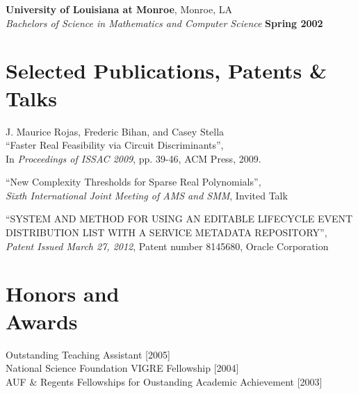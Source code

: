 \documentclass[margin,line,12pt]{resume}
\begin{document}
\begin{resume}
    \textbf{University of Louisiana at Monroe}, Monroe, LA \vspace{2mm}\\\vspace{1mm}%
    \textsl{Bachelors of Science in Mathematics and Computer Science} \hfill \textbf{ Spring 2002}\vspace{-3mm}\\\vspace{-1mm}%

    \section{\mysidestyle Selected Publications, Patents \& Talks}

    J. Maurice Rojas, Frederic Bihan, and Casey Stella\\
    ``Faster Real Feasibility via Circuit Discriminants'',\\
    In \textsl{Proceedings of ISSAC 2009}, pp. 39-46, ACM Press, 2009.

\vspace{-2mm}
    ``New Complexity Thresholds for Sparse Real Polynomials'',\\
    \textsl{Sixth International Joint Meeting of AMS and SMM}, Invited Talk

    ``SYSTEM AND METHOD FOR USING AN EDITABLE LIFECYCLE EVENT DISTRIBUTION LIST WITH A SERVICE METADATA REPOSITORY'',\\
    \textsl{Patent Issued March 27, 2012}, Patent number 8145680, Oracle Corporation
    
    \section{\mysidestyle Honors and\\Awards} 

    Outstanding Teaching Assistant [2005]                                                           \vspace{1mm}\\
    National Science Foundation VIGRE Fellowship [2004]                                             \vspace{1mm}\\
    AUF \& Regents Fellowships for Oustanding Academic Achievement [2003]                           


\end{resume}
\end{document}
